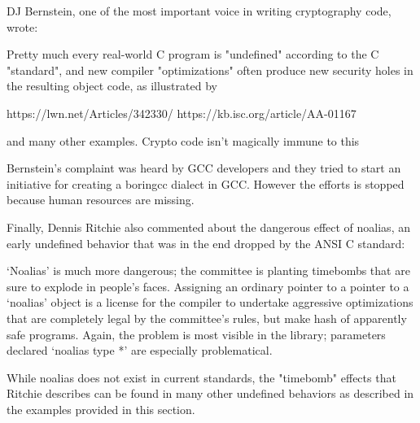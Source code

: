DJ Bernstein, one of the most important voice in writing cryptography
code, wrote:
\begin{displayquote}
Pretty much every real-world C
program is "undefined" according to the C "standard", and new compiler
"optimizations" often produce new security holes in the resulting object
code, as illustrated by

https://lwn.net/Articles/342330/
https://kb.isc.org/article/AA-01167

and many other examples. Crypto code isn't magically immune to this
\end{displayquote}

Bernstein's complaint was heard by GCC developers and they tried to
start an initiative for creating a boringcc dialect in GCC. However the
efforts is stopped because human resources are missing.

Finally, Dennis Ritchie also commented about the dangerous effect of
noalias, an early undefined behavior that was in the end dropped by
the ANSI C standard:
\begin{displayquote}
`Noalias' is much more dangerous; the committee is planting timebombs
that are sure to explode in people's faces.  Assigning an ordinary
pointer to a pointer to a `noalias' object is a license for the compiler
to undertake aggressive optimizations that are completely legal by the
committee's rules, but make hash of apparently safe programs.  Again,
the problem is most visible in the library; parameters declared `noalias
type *' are especially problematical. 
\end{displayquote}

While noalias does not exist in current standards, the "timebomb"
effects that Ritchie describes can be found in many other undefined
behaviors as described in the examples provided in this section.

